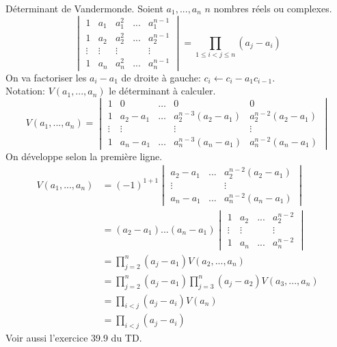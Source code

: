 \documentclass[11pt]{article}
\begin{document}
\begin{thm}{Déterminant de Vandermonde.}{}
    Soient $a_1,...,a_n$ $n$ nombres réels ou complexes.
    \begin{equation*}
        \begin{vmatrix}
            1&a_1&a_1^2&...&a_1^{n-1}\\
            1&a_2&a_2^2&...&a_2^{n-1}\\
            \vdots&\vdots&\vdots&&\vdots\\
            1&a_n&a_n^2&...&a_n^{n-1}
        \end{vmatrix}
        = \prod_{1\leq i < j \leq n}(a_j-a_i)
    \end{equation*}
    \tcblower
    On va factoriser les $a_i-a_1$ de droite à gauche: $c_i \gets c_i - a_1 c_{i-1}$.\\
    Notation: $V(a_1,...,a_n)$ le déterminant à calculer.
    \begin{equation*}
        V(a_1,...,a_n)=\begin{vmatrix}
            1&0&\dots&0&0\\
            1&a_2-a_1&\dots&a_2^{n-3}(a_2-a_1)&a_2^{n-2}(a_2-a_1)\\
            \vdots&\vdots&&\vdots&\vdots\\
            1&a_n-a_1&\dots&a_n^{n-3}(a_n-a_1)&a_n^{n-2}(a_n-a_1)
        \end{vmatrix}
    \end{equation*}
    On développe selon la première ligne.
    \begin{align*}
        V(a_1,...,a_n)&=(-1)^{1+1}\begin{vmatrix}
            a_2-a_1&...&a_2^{n-2}(a_2-a_1)\\
            \vdots&&\vdots\\
            a_n-a_1&...&a_n^{n-2}(a_n-a_1)
        \end{vmatrix}\\
        &=(a_2-a_1)...(a_n-a_1)\begin{vmatrix}
            1&a_2&...&a_2^{n-2}\\
            \vdots&\vdots&&\vdots\\
            1&a_n&...&a_n^{n-2}
        \end{vmatrix}\\
        &=\prod_{j=2}^n(a_j-a_1)V(a_2,...,a_n)\\
        &=\prod_{j=2}^n(a_j-a_1)\prod_{j=3}^n(a_j-a_2)V(a_3,...,a_n)\\
        &=\prod_{i<j}(a_j-a_i)V(a_n)\\
        &=\prod_{i<j}(a_j-a_i)
    \end{align*}
    Voir aussi l'exercice 39.9 du TD.
\end{thm}
\end{document}
